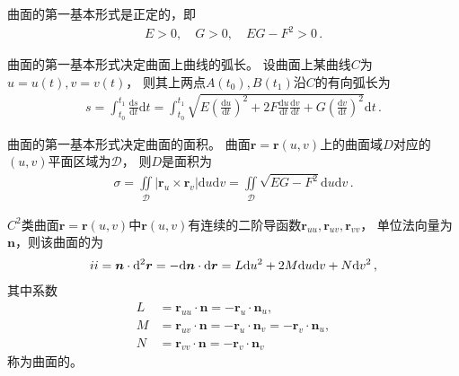 \begin{corollary}
    曲面的第一基本形式是正定的，即
    \begin{align}\label{eq:03ex01.20}
        E>0,\quad G>0,\quad EG-F^2>0\, .
    \end{align}
\end{corollary}

\begin{corollary}
    曲面的第一基本形式决定曲面上曲线的弧长。
    设曲面上某曲线$C$为$u=u(t),v=v(t)$，
    则其上两点$A(t_0),B(t_1)$沿$C$的有向弧长为
    \begin{align}\label{eq:03ex01.21}
        s=\int_{t_0}^{t_1}{\frac{\mathrm{d}s}{\mathrm{d}t}\mathrm{d}t}=\int_{t_0}^{t_1}
        {\sqrt{E\left(\frac{\mathrm{d}u}{\mathrm{d}t}\right)^2+
            2F\frac{\mathrm{d}u}{\mathrm{d}t}\frac{\mathrm{d}v}{\mathrm{d}t}+
            G\left(\frac{\mathrm{d}v}{\mathrm{d}t}\right)^2}
        \mathrm{d}t}\, .
    \end{align}
\end{corollary}

\begin{corollary}
    曲面的第一基本形式决定曲面的面积。
    曲面$\bm r=\bm r(u,v)$上的曲面域$D$对应的$(u,v)$平面区域为$\mathscr{D}$，
    则$D$是面积为
    \begin{align}\label{eq:03ex01.22}
        \sigma=\iint\limits_{\mathscr{D}}{|\bm r_u\times\bm r_v|\mathrm{d}u\mathrm{d}v}=\iint\limits_{\mathscr{D}}{\sqrt{EG-F^2}\mathrm{d}u\mathrm{d}v}\, .
    \end{align}
\end{corollary}

\begin{definition}
    $C^2$类曲面$\bm r=\bm r(u,v)$中$\bm r(u,v)$有连续的二阶导函数$\bm r_{uu},\bm r_{uv},\bm r_{vv}$，
    单位法向量为$\bm n$，则该曲面的为
    \begin{align}\label{eq:03ex01.23}
        \uppercase\expandafter{\romannumeral2}=\bm n\cdot\mathrm{d}^2\bm r=-\mathrm{d}\bm n\cdot\mathrm{d}\bm r=L\mathrm{d}u^2+2M\mathrm{d}u\mathrm{d}v+N\mathrm{d}v^2\, ,
    \end{align}
    其中系数
    \begin{align}\label{eq:03ex01.24}
        L & =\bm r_{uu}\cdot\bm n=-\bm r_u\cdot\bm n_u,                      \\
        M & =\bm r_{uv}\cdot\bm n=-\bm r_u\cdot\bm n_v=-\bm r_v\cdot\bm n_u, \\
        N & =\bm r_{vv}\cdot\bm n=-\bm r_v\cdot\bm n_v\,
    \end{align}
    称为曲面的。
\end{definition}

